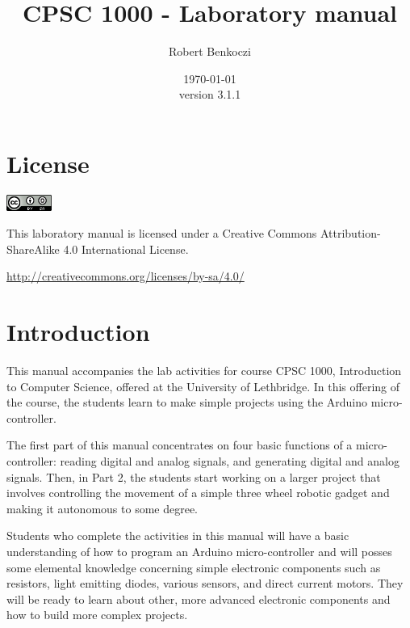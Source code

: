 \documentclass[12pt]{book}
\title{CPSC 1000 - Laboratory manual}    %
\author{Robert Benkoczi}              %
\date{\today\\ version 3.1.1}  %
\begin{document}
\frontmatter                            %
\maketitle                              %
\tableofcontents                        %

\chapter{License}


\includegraphics[width=4em]{by-sa.png}

\noindent
This laboratory manual is licensed under a Creative Commons
Attribution-ShareAlike 4.0 International License.

\noindent
\url{http://creativecommons.org/licenses/by-sa/4.0/}

\chapter{Introduction}

This manual accompanies the lab activities for course CPSC 1000,
Introduction to Computer Science, offered at the University of
Lethbridge. In this offering of the course, the students learn to
make simple projects using the Arduino micro-controller. 

The first part of this manual concentrates on four basic functions of
a micro-controller: reading digital and analog signals, and generating
digital and analog signals. Then, in Part 2, the students start
working on a larger project that involves controlling the movement of
a simple three wheel robotic gadget and making it autonomous to some
degree.

Students who complete the activities in this manual will have a basic
understanding of how to program an Arduino micro-controller and will
posses some elemental knowledge concerning simple electronic
components such as resistors, light emitting diodes, various sensors,
and direct current motors. They will be ready to learn about other, more
advanced electronic components and how to build more complex projects.
\end{document}

